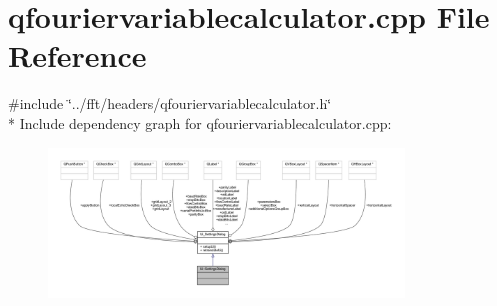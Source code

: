 \hypertarget{a00123}{\section{qfouriervariablecalculator.\+cpp File Reference}
\label{a00123}
}
{\ttfamily \#include \char`\"{}../fft/headers/qfouriervariablecalculator.\+h\char`\"{}}\\*
Include dependency graph for qfouriervariablecalculator.\+cpp\+:
\nopagebreak
\begin{figure}[H]
\begin{center}
\leavevmode
\includegraphics[width=268pt]{d2/d0a/a00333}
\end{center}
\end{figure}
